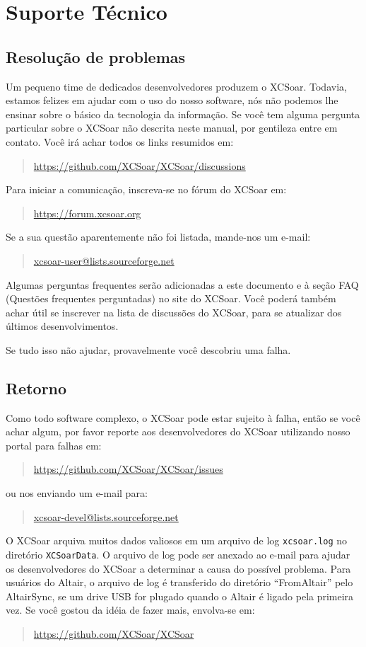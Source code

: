 \section{Suporte Técnico}

\subsection*{Resolução de problemas}
Um pequeno time de dedicados desenvolvedores produzem o XCSoar.  Todavia, estamos felizes em ajudar com o uso do nosso software, nós não podemos lhe ensinar sobre o básico da tecnologia da informação.  Se você tem alguma pergunta particular sobre o XCSoar não descrita neste manual, por gentileza entre em contato.  Você irá achar todos os links resumidos em:
\begin{quote}
\url{https://github.com/XCSoar/XCSoar/discussions}
\end{quote}
Para iniciar a comunicação, inscreva-se no fórum do XCSoar em:
\begin{quote}
\url{https://forum.xcsoar.org}
\end{quote}
Se a sua questão aparentemente não foi listada, mande-nos um e-mail:
\begin{quote}
\href{mailto:xcsoar-user@lists.sourceforge.net}{xcsoar-user@lists.sourceforge.net}
\end{quote}
Algumas perguntas frequentes serão adicionadas a este documento e à seção FAQ (Questões frequentes perguntadas) no site do XCSoar.  Você poderá também achar útil se inscrever na lista de discussões do XCSoar, para se atualizar dos últimos desenvolvimentos.

Se tudo isso não ajudar, provavelmente você descobriu uma falha.



\subsection*{Retorno}
Como todo software complexo, o XCSoar pode estar sujeito à falha, então se você achar algum, por favor reporte aos desenvolvedores do XCSoar utilizando nosso portal para falhas em:
\begin{quote}
\url{https://github.com/XCSoar/XCSoar/issues}
\end{quote}
ou nos enviando um e-mail para: 
\begin{quote}
\href{mailto:xcsoar-devel@lists.sourceforge.net}{xcsoar-devel@lists.sourceforge.net}
\end{quote}
O XCSoar arquiva muitos dados valiosos em um arquivo de log 
\verb|xcsoar.log| no diretório \texttt{XCSoarData}. O arquivo de log pode ser anexado ao e-mail para ajudar os desenvolvedores do XCSoar a determinar a causa do possível problema.  Para usuários do Altair, o arquivo de log é transferido do diretório “FromAltair” pelo AltairSync, se um drive USB for plugado quando o Altair é ligado pela primeira vez.  Se você gostou da idéia de fazer mais, envolva-se em:
\begin{quote}
\url{https://github.com/XCSoar/XCSoar}
\end{quote}

